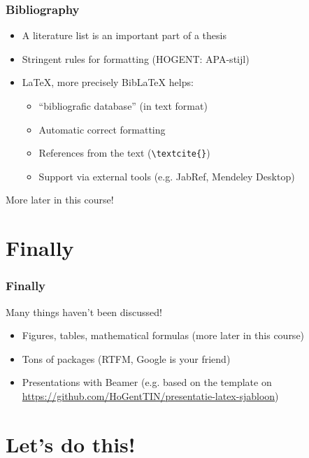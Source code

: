 \documentclass[aspectratio=169]{beamer}
\begin{document}
\begin{frame}[fragile]
  \frametitle{Bibliography}

  \begin{itemize}
    \item<+-> A literature list is an important part of a thesis
    \item<+-> Stringent rules for formatting (HOGENT: APA-stijl)
    \item<+-> {\LaTeX}, more precisely Bib{\LaTeX} helps:
    \begin{itemize}
      \item<+-> ``bibliografic database'' (in text format)
      \item<+-> Automatic correct formatting
      \item<+-> References from the text (\verb|\textcite{}|)
      \item<+-> Support via external tools (e.g. JabRef, Mendeley Desktop)
    \end{itemize}
  \end{itemize}

  \pause More later in this course!
\end{frame}

\section{Finally}

\begin{frame}[fragile]
 \frametitle{Finally}

  Many things haven't been discussed!

  \begin{itemize}
    \item<+-> Figures, tables, mathematical formulas (more later in this course)
    \item<+-> Tons of packages (RTFM, Google is your friend)
    \item<+-> Presentations with Beamer (e.g. based on the template on \url{https://github.com/HoGentTIN/presentatie-latex-sjabloon})

  \end{itemize}
\end{frame}

\section{Let's do this!}
\end{document}
